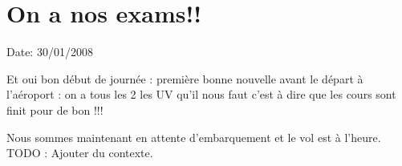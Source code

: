 \section{On a nos exams!!}

Date: 30/01/2008

\begin{multicols}{2}

Et oui bon début de journée : première bonne nouvelle avant le départ à l'aéroport : on a tous les 2 les UV qu'il nous faut c'est à dire que les cours sont finit pour de bon !!!

Nous sommes maintenant en attente d'embarquement et le vol est à l'heure.
TODO : Ajouter du contexte.

\end{multicols}


